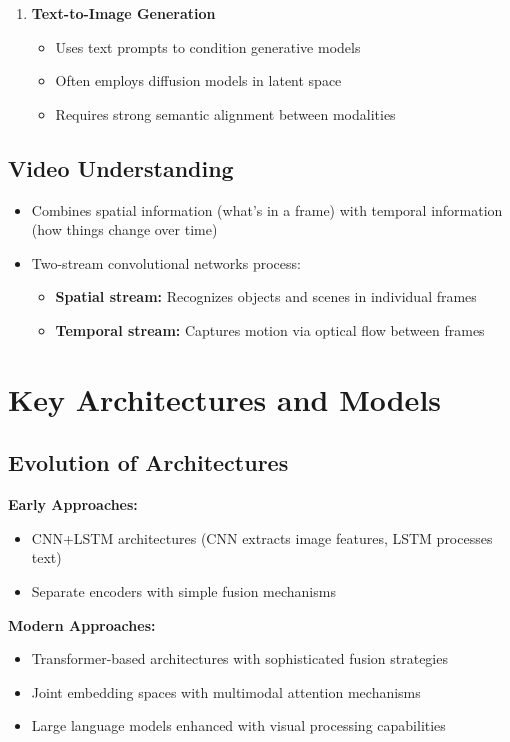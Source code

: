 \begin{enumerate}
    \item \textbf{Text-to-Image Generation}
    \begin{itemize}
        \item Uses text prompts to condition generative models
        \item Often employs diffusion models in latent space
        \item Requires strong semantic alignment between modalities
    \end{itemize}
\end{enumerate}
\subsection*{Video Understanding}

\begin{itemize}
    \item Combines spatial information (what's in a frame) with temporal information (how things change over time)
    \item Two-stream convolutional networks process:
    \begin{itemize}
        \item \textbf{Spatial stream:} Recognizes objects and scenes in individual frames
        \item \textbf{Temporal stream:} Captures motion via optical flow between frames
    \end{itemize}
\end{itemize}
\section*{Key Architectures and Models}

\subsection*{Evolution of Architectures}

\textbf{Early Approaches:}
\begin{itemize}
    \item CNN+LSTM architectures (CNN extracts image features, LSTM processes text)
    \item Separate encoders with simple fusion mechanisms
\end{itemize}

\textbf{Modern Approaches:}
\begin{itemize}
    \item Transformer-based architectures with sophisticated fusion strategies
    \item Joint embedding spaces with multimodal attention mechanisms
    \item Large language models enhanced with visual processing capabilities
\end{itemize}

